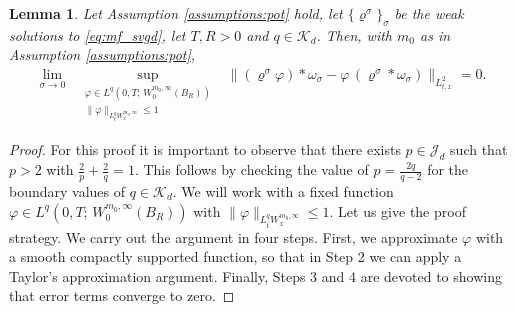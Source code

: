 \documentclass[reqno, 11pt]{amsart}
\numberwithin{equation}{section}
\newtheorem{lem}[thm]{Lemma}
\theoremstyle{definition}
\begin{document}
\begin{lem}\label{lem:comm_est}
    Let Assumption \ref{assumptions:pot} hold, let $\{\varrho^\sigma\}_\sigma$ be the weak solutions to \eqref{eq:mf_svgd}, let $T,R>0$ and $q\in \mathcal{K}_d$. Then, with $m_0$ as in Assumption \ref{assumptions:pot},
    \begin{align}
        \label{eq:commutator_representation}
        \lim_{\sigma\to 0}\;\;\sup_{\substack{\varphi\in L^q(0,T;\, W_0^{m_0,\infty}(B_R)) \\ \|\varphi\|_{ L_t^q W_x^{m_0,\infty}}\leq 1}}\;\;
        \|(\varrho^\sigma \varphi)\ast\omega_\sigma
        -\varphi\,(\varrho^\sigma\ast\omega_\sigma)\|_{L_{t,x}^2}
        =0.
    \end{align}
\end{lem}
\begin{proof}
    For this proof it is important to observe that there exists $p\in \mathcal{J}_d$ such that $p>2$ with $\tfrac{2}{p}+\tfrac{2}{q}=1$. This follows by checking the value of $p=\frac{2q}{q-2}$ for the boundary values of $q \in \mathcal{K}_d$. We will work with a fixed function $\varphi\in L^q(0,T;\, W_0^{m_0,\infty}(B_R))$ with $\|\varphi\|_{ L_t^q W_x^{m_0,\infty}}\leq 1$. Let us give the proof strategy. We carry out the argument in four steps. First, we approximate $\varphi$ with a smooth compactly supported function, so that in Step 2 we can apply a Taylor's approximation argument. Finally, Steps 3 and 4 are devoted to showing that error terms converge to zero.
    

\end{proof}
\end{document}
